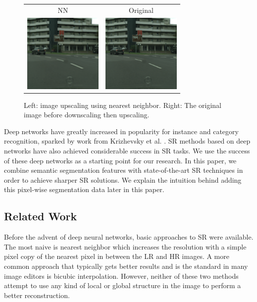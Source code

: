 \documentclass[10pt,twocolumn,letterpaper]{article}
\begin{document}
\begin{figure}[ht] 
    \begin{tabular}{cc}
            NN & Original \\
    \includegraphics[trim=0 0 0 0, clip,
        width=1.5in]{images/example_lr_image.png} &
    \includegraphics[trim=0 0 0 0, clip,
        width=1.5in]{images/example_hr_image.png} \\
    
    \end{tabular}
    \caption{Left: image upscaling using nearest neighbor. Right: The
    original image before downscaling then upscaling.} 
    \label{fig:exampleIntroFirst}
\end{figure}

Deep networks have greatly increased in popularity for instance and category
recognition, sparked by work from Krizhevsky et al. \cite{AlexNet}. SR methods
based on deep networks have also achieved considerable success in SR tasks. We
use the success of these deep networks as a starting point for our research. In
this paper, we combine semantic segmentation features with state-of-the-art SR
techniques in order to achieve sharper SR solutions. We explain the intuition
behind adding this pixel-wise segmentation data later in this paper.


\subsection{Related Work}
Before the advent of deep neural networks, basic approaches to SR were
available. The most naive is nearest neighbor which increases the resolution
with a simple pixel copy of the nearest pixel in between the LR and HR images.
A more common approach that typically gets better results and is the standard
in many image editors is bicubic interpolation.  However, neither of these two
methods attempt to use any kind of local or global structure in the image to
perform a better reconstruction.
\end{document}
